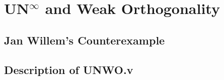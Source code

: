 \chapter{UN\texorpdfstring{$^\infty$}{} and Weak Orthogonality}\label{chap:unwo}


\section{Jan Willem's Counterexample}


\section{Description of UNWO.v}
